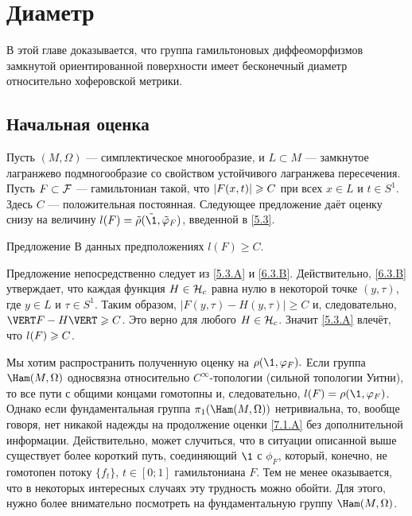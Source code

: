 \chapter{Диаметр}

В этой главе доказывается, что группа гамильтоновых диффеоморфизмов
замкнутой ориентированной поверхности имеет бесконечный диаметр
относительно хоферовской метрики. 

\section{Начальная оценка}
Пусть $(M, \Omega)$ — симплектическое многообразие, и $L \subset M$
— замкнутое лагранжево подмногообразие со свойством  устойчивого
лагранжева пересечения. 
Пусть $F \subset \mathcal{F}$ — гамильтониан такой, что $| F (x, t) | \z\ge C$ при всех $x \in L$ и $t \in S^1$.
Здесь $C$ — положительная постоянная.
Следующее предложение даёт оценку снизу на величину $l (F) \z= \tilde\rho (\tilde\1, \tilde\phi_F)$, введенной в \ref{5.3}.

\begin{thm}{Предложение}\label{7.1.A}
В данных предположениях $l (F) \ge C$.
\end{thm}

Предложение непосредственно следует из \ref{5.3.A} и \ref{6.3.B}.
Действительно, \ref{6.3.B} утверждает, что каждая функция $H \in \mathcal{H}_c$ равна нулю в некоторой точке $(y, \tau)$, где $y \in L$ и $\tau \in S^1$.
Таким образом, $| F (y, \tau) - H (y, \tau) | \ge C$ и, следовательно, $\VERT F - H \VERT \z\ge C$.
Это верно для любого $H \in \mathcal{H}_c$.
Значит \ref{5.3.A} влечёт, что $l (F) \z\ge C$.
\qeds

Мы хотим распространить полученную оценку на $\rho (\1, \phi_F).$
Если группа $\Ham (M, \Omega)$ односвязна относительно $C^\infty$-топологии (сильной топологии Уитни), то все пути с общими концами гомотопны и, следовательно, $l (F) = \rho (\1, \phi_F)$.
Однако если фундаментальная группа $\pi_1 (\Ham (M, \Omega))$ нетривиальна, то, вообще говоря, нет никакой надежды на продолжение оценки \ref{7.1.A} без дополнительной информации.
Действительно, может случиться, что в ситуации описанной выше существует более короткий путь, соединяющий $\1$ с $\phi_F$, который, конечно, не гомотопен потоку $\{f_t\}$, $t \in [0; 1]$ гамильтониана $F$.
Тем не менее оказывается, что в некоторых интересных случаях эту трудность можно обойти.
Для этого, нужно более внимательно посмотреть на фундаментальную группу $\Ham (M, \Omega)$.


